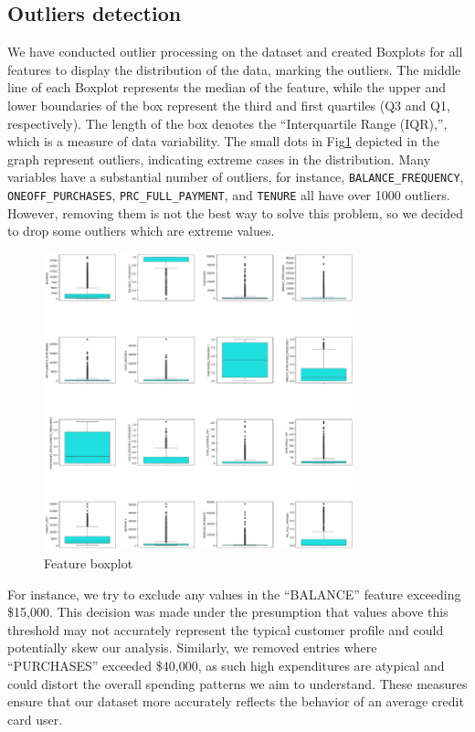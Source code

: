 \documentclass{article}
\begin{document}
\subsection{Outliers detection}
\label{sec:Outliers detection}
We have conducted outlier processing on the dataset and created Boxplots for all features to display the distribution of the data, marking the outliers. The middle line of each Boxplot represents the median of the feature, while the upper and lower boundaries of the box represent the third and first quartiles (Q3 and Q1, respectively). The length of the box denotes the ``Interquartile Range (IQR),'', which is a measure of data variability. The small dots in Fig\ref{fig:boxplot} depicted in the graph represent outliers, indicating extreme cases in the distribution. Many variables have a substantial number of outliers, for instance, \texttt{BALANCE\_FREQUENCY}, \texttt{ONEOFF\_PURCHASES}, \texttt{PRC\_FULL\_PAYMENT}, and \texttt{TENURE} all have over 1000 outliers. However, removing them is not the best way to solve this problem, so we decided to drop some outliers which are extreme values. 
\begin{figure}[hbt!]
    \centering
    \includegraphics[width=0.8\textwidth]{fig/zya/boxplot.png}
    \caption{Feature boxplot}
    \label{fig:boxplot}  %
\end{figure}
For instance, we try to exclude any values in the ``BALANCE'' feature exceeding \$15,000. This decision was made under the presumption that values above this threshold may not accurately represent the typical customer profile and could potentially skew our analysis. Similarly, we removed entries where ``PURCHASES'' exceeded \$40,000, as such high expenditures are atypical and could distort the overall spending patterns we aim to understand. These measures ensure that our dataset more accurately reflects the behavior of an average credit card user.
\end{document}
